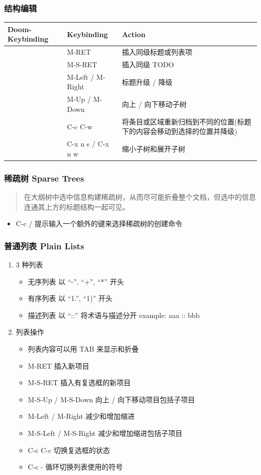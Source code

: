 \documentclass[11pt]{article}
\begin{document}
\subsubsection{结构编辑}
\label{sec:orgbed7193}
\begin{center}
\begin{tabular}{lll}
Doom-Keybinding & Keybinding & Action\\[0pt]
\hline
 & M-RET & 插入同级标题或列表项\\[0pt]
 & M-S-RET & 插入同级 TODO\\[0pt]
 & M-Left / M-Right & 标题升级 / 降级\\[0pt]
 & M-Up / M-Down & 向上 / 向下移动子树\\[0pt]
 & C-c C-w & 将条目或区域重新归档到不同的位置(标题下的内容会移动到选择的位置并降级)\\[0pt]
 & C-x n s / C-x n w & 缩小子树和展开子树\\[0pt]
\end{tabular}
\end{center}
\subsubsection{稀疏树 Sparse Trees}
\label{sec:orgd993dff}
\begin{quote}
在大纲树中选中信息构建稀疏树，从而尽可能折叠整个文档，但选中的信息连通其上方的标题结构一起可见。
\end{quote}

\begin{itemize}
\item C-c /
提示输入一个额外的键来选择稀疏树的创建命令
\end{itemize}
\subsubsection{普通列表 Plain Lists}
\label{sec:org738e98b}
\begin{enumerate}
\item 3 种列表
\label{sec:org50fc74e}
\begin{itemize}
\item 无序列表
以 ``-'', ``+'', ``*'' 开头
\item 有序列表
以 ``1.'', ``1)'' 开头
\item 描述列表
以 ``::'' 将术语与描述分开
example: aaa :: bbb
\end{itemize}
\item 列表操作
\label{sec:org0215f6c}
\begin{itemize}
\item 列表内容可以用 TAB 来显示和折叠
\item M-RET
插入新项目
\item M-S-RET
插入有复选框的新项目
\item M-S-Up / M-S-Down
向上 / 向下移动项目包括子项目
\item M-Left / M-Right
减少和增加缩进
\item M-S-Left / M-S-Right
减少和增加缩进包括子项目
\item C-c C-c
切换复选框的状态
\item C-c -
循环切换列表使用的符号
\end{itemize}
\end{enumerate}
\end{document}
